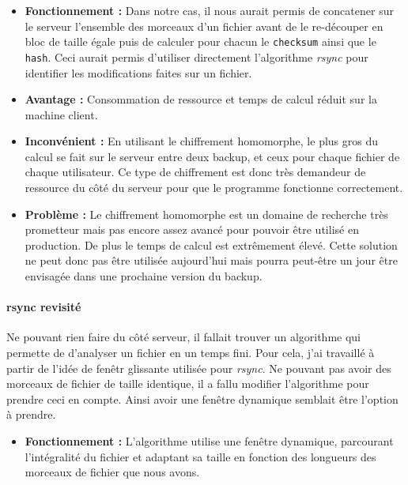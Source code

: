 \documentclass[a4paper,10pt, twoside]{report}
\begin{document}
\begin{spacing}{1.2}
\begin{itemize}
 \item \textbf{Fonctionnement :} Dans notre cas, il nous aurait permis de
 concatener sur le serveur l'ensemble des morceaux d'un fichier avant de le
 re-d\'ecouper en bloc de taille \'egale puis de calculer pour chacun le
 \texttt{checksum} ainsi que le \texttt{hash}. Ceci aurait permis d'utiliser
 directement l'algorithme \textit{rsync} pour identifier les modifications
 faites sur un fichier.

 \item \textbf{Avantage :} Consommation de ressource et temps de calcul
 r\'eduit sur la machine client.
 
 \item \textbf{Inconv\'enient :} En utilisant le chiffrement homomorphe, le
 plus gros du calcul se fait sur le serveur entre deux backup, et ceux pour
 chaque fichier de chaque utilisateur. Ce type de chiffrement est donc tr\`es
 demandeur de ressource du c\^ot\'e du serveur pour que le programme fonctionne
 correctement.

 \item \textbf{Probl\`eme :} Le chiffrement homomorphe est un domaine de
 recherche tr\`es prometteur mais pas encore assez avanc\'e pour pouvoir
 \^etre utilis\'e en production. De plus le temps de calcul est extr\^emement
 \'elev\'e. Cette solution ne peut donc pas \^etre utilis\'ee aujourd'hui mais
 pourra peut-\^etre un jour \^etre envisag\'ee dans une prochaine version du
backup.
\end{itemize}

\paragraph{rsync revisit\'e\\}
Ne pouvant rien faire du c\^ot\'e serveur, il fallait trouver un algorithme
qui permette de d'analyser un fichier en un temps fini. Pour cela, j'ai
travaill\'e \`a partir de l'id\'ee de fen\^etr glissante utilis\'ee pour
\textit{rsync}. Ne pouvant pas avoir des morceaux de fichier de taille
identique, il a fallu modifier l'algorithme pour prendre ceci en compte. Ainsi
avoir une fen\^etre dynamique semblait \^etre l'option \`a prendre.

\begin{itemize}
 \item \textbf{Fonctionnement :} L'algorithme utilise une fen\^etre dynamique,
 parcourant l'int\'egralit\'e du fichier et adaptant sa taille en fonction
 des longueurs des morceaux de fichier que nous avons.
 

\end{itemize}
\end{spacing}
\end{document}
